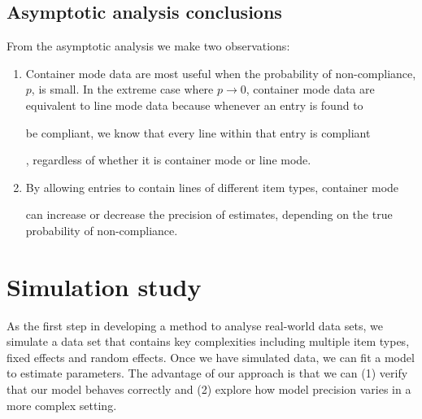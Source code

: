 \documentclass[useAMS,usenatbib,referee]{biom}
\newif\ifproofread
\newcommand{\rev}[1]{%
\ifproofread
\hl{#1}%
\else
#1%
\fi
}
\begin{document}
%
%
%
%


\subsection{Asymptotic analysis conclusions}

From the asymptotic analysis we make two observations:
\begin{enumerate}
\item Container mode data are most useful when the probability of non-compliance, \(p\), is small. In the extreme case where \(p\rightarrow 0\), container mode data are equivalent to line mode data because whenever an entry is found to \rev{be compliant, we know that every line within that entry is compliant}, regardless of whether it is container mode or line mode. 
\item \rev{By allowing entries to contain lines of different item types, container mode} can increase or decrease the precision of estimates, depending on the true probability of non-compliance.
\end{enumerate}


\section{Simulation study}
As the first step in developing a method to analyse real-world data sets, we simulate a data set that contains key complexities including multiple item types, fixed effects and random effects. Once we have simulated data, we can fit a model to estimate parameters. The advantage of our approach is that we can (1) verify that our model behaves correctly and (2) explore how model precision varies in a more complex setting.
\end{document}
